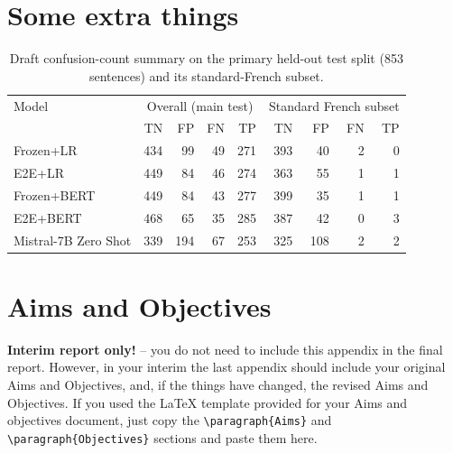 \documentclass[12pt]{article}
\begin{document}
\appendix

\renewcommand{\thesection}{Appendix \Alph{section}}

\section{Some extra things}


\begin{table}[H]
    \centering
    \footnotesize
    \begin{tabular}{lrrrrrrrr}
        \hline
        Model & \multicolumn{4}{c}{Overall (main test)} & \multicolumn{4}{c}{Standard French subset} \\
         & TN & FP & FN & TP & TN & FP & FN & TP \\
        \hline
        Frozen+LR & 434 & 99 & 49 & 271 & 393 & 40 & 2 & 0 \\
        E2E+LR & 449 & 84 & 46 & 274 & 363 & 55 & 1 & 1 \\
        Frozen+BERT & 449 & 84 & 43 & 277 & 399 & 35 & 1 & 1 \\
        E2E+BERT & 468 & 65 & 35 & 285 & 387 & 42 & 0 & 3 \\
        Mistral-7B Zero Shot & 339 & 194 & 67 & 253 & 325 & 108 & 2 & 2 \\
        \hline
    \end{tabular}
    \caption{Draft confusion-count summary on the primary held-out test split (853 sentences) and its standard-French subset.}
    \label{tab:main-test-confusion-draft}
\end{table}


\section{Aims and Objectives}

\textbf{Interim report only!} -- you do not need to include this appendix in the final report.  However, in your interim the last appendix should include your original Aims and Objectives, and, if the things have changed, the revised Aims and Objectives. If you used the \LaTeX{} template provided for your Aims and objectives document, just copy the \verb$\paragraph{Aims}$ and \verb$\paragraph{Objectives}$ sections and paste them here.
\end{document}
